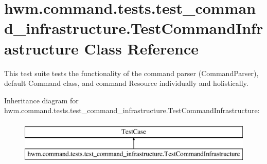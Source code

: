 \hypertarget{classhwm_1_1command_1_1tests_1_1test__command__infrastructure_1_1_test_command_infrastructure}{\section{hwm.\-command.\-tests.\-test\-\_\-command\-\_\-infrastructure.\-Test\-Command\-Infrastructure Class Reference}
\label{classhwm_1_1command_1_1tests_1_1test__command__infrastructure_1_1_test_command_infrastructure}
}


This test suite tests the functionality of the command parser (Command\-Parser), default Command class, and command Resource individually and holistically.  


Inheritance diagram for hwm.\-command.\-tests.\-test\-\_\-command\-\_\-infrastructure.\-Test\-Command\-Infrastructure\-:\begin{figure}[H]
\begin{center}
\leavevmode
\includegraphics[height=2.000000cm]{classhwm_1_1command_1_1tests_1_1test__command__infrastructure_1_1_test_command_infrastructure}
\end{center}
\end{figure}
